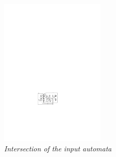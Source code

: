 
 \begin{figure}
\begin{center}
\includegraphics[width=50mm]{state_copy_transition.pdf}
\end{center}
\caption{{\em Intersection of the input automata}}
\label{transition}
\end{figure}

\begin{figure}
\begin{center}
\end{center}
\label{fig:Algorithm}
\end{figure}
